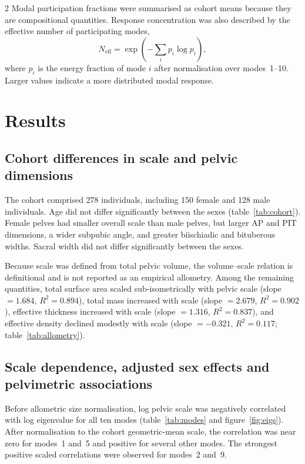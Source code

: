 \documentclass[openacc]{rsproca_new}
\begin{document}
\begin{multicols}{2}
Modal participation fractions were summarised as cohort means because they are compositional quantities. Response concentration was also described by the effective number of participating modes,
\begin{equation}
N_{\mathrm{eff}} = \exp\left(-\sum_i p_i\log p_i\right),
\end{equation}
where $p_i$ is the energy fraction of mode $i$ after normalisation over modes~1--10. Larger values indicate a more distributed modal response.

\section{Results}
\subsection{Cohort differences in scale and pelvic dimensions}

The cohort comprised 278 individuals, including 150 female and 128 male individuals. Age did not differ significantly between the sexes (table~\ref{tab:cohort}). Female pelves had smaller overall scale than male pelves, but larger AP and PIT dimensions, a wider subpubic angle, and greater biischiadic and bituberous widths. Sacral width did not differ significantly between the sexes.

Because scale was defined from total pelvic volume, the volume--scale relation is definitional and is not reported as an empirical allometry. Among the remaining quantities, total surface area scaled sub-isometrically with pelvic scale (slope $=1.684$, $R^2=0.894$), total mass increased with scale (slope $=2.679$, $R^2=0.902$), effective thickness increased with scale (slope $=1.316$, $R^2=0.837$), and effective density declined modestly with scale (slope $=-0.321$, $R^2=0.117$; table~\ref{tab:allometry}).

\subsection{Scale dependence, adjusted sex effects and pelvimetric associations}

Before allometric size normalisation, log pelvic scale was negatively correlated with log eigenvalue for all ten modes (table~\ref{tab:modes} and figure~\ref{fig:eigs}). After normalisation to the cohort geometric-mean scale, the correlation was near zero for modes~1 and~5 and positive for several other modes. The strongest positive scaled correlations were observed for modes~2 and~9.


\end{multicols}
\end{document}
